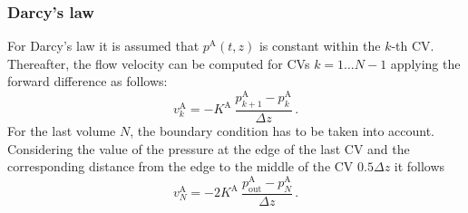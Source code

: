 \documentclass[pdftex,a4paper, 12pt]{article}
\begin{document}
\subsubsection*{Darcy's law}
%
%
For Darcy's law it is assumed that $p^{\mathrm{A}}(t,z)$ is constant within the $k$-th CV. Thereafter, the flow velocity can be computed for CVs $k=1 \dots N-1$ applying the forward difference as follows:
%
\begin{equation}
		v_{k}^{\mathrm{A}} = -K^{\mathrm{A}} ~\frac{p_{k+1}^{\mathrm{A}} - p_{k}^{\mathrm{A}}}{\Delta z} \, .
		\label{eq:imp_bal_disc}
\end{equation}
%
For the last volume $N$, the boundary condition has to be taken into account. Considering the value of the pressure at the edge of the last CV and the corresponding distance from the edge to the middle of the CV $0.5 \Delta z$ it follows
%
\begin{equation}
	v_{N}^{\mathrm{A}} = -2 K^{\mathrm{A}} ~\frac{p^{\mathrm{A}}_{\mathrm{out}} - p_{N}^{\mathrm{A}}}{\Delta z} \, .
	\label{eq:imp_bal_discN}
\end{equation}
%
\end{document}
